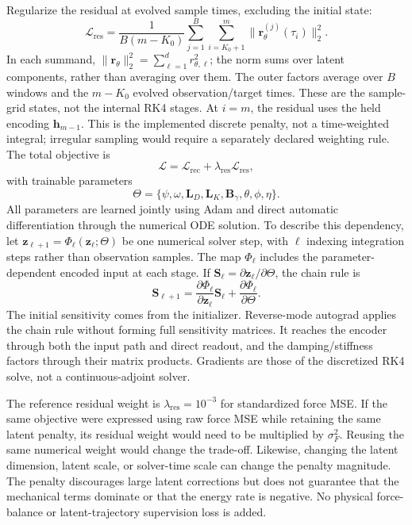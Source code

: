 \documentclass[journal,twoside]{IEEEtran}
\begin{document}
Regularize the residual at evolved sample times, excluding the initial state:
\begin{equation}
    \mathcal L_{\mathrm{res}}=
    \frac{1}{B(m-K_0)}\sum_{j=1}^{B}\sum_{i=K_0+1}^{m}
    \|\mathbf r^{(j)}_\theta(\tau_i)\|_2^2.
    \label{eq:residual_loss}
\end{equation}
In each summand,
$\|\mathbf r_\theta\|_2^2=\sum_{\ell=1}^d r_{\theta,\ell}^2$;
the norm sums over latent components, rather than averaging over them.
The outer factors average over $B$ windows and the $m-K_0$ evolved
observation/target times. These are the sample-grid states, not the
internal RK4 stages. At $i=m$, the residual uses the held encoding
$\mathbf h_{m-1}$. This is the implemented discrete penalty, not a
time-weighted integral; irregular sampling would require a separately
declared weighting rule. The total objective is
\begin{equation}
    \mathcal L=\mathcal L_{\mathrm{rec}}
    +\lambda_{\mathrm{res}}\mathcal L_{\mathrm{res}},
    \label{eq:total_loss}
\end{equation}
with trainable parameters
\begin{equation}
    \Theta=\{\psi,\omega,\mathbf L_D,\mathbf L_K,
    \mathbf B_\gamma,\theta,\phi,\eta\}.
    \label{eq:trainable_parameters}
\end{equation}
All parameters are learned jointly using Adam and direct automatic
differentiation through the numerical ODE solution. To describe this
dependency, let $\mathbf z_{\ell+1}=\Phi_\ell(\mathbf z_\ell;\Theta)$
be one numerical solver step, with $\ell$ indexing integration steps
rather than observation samples. The map $\Phi_\ell$ includes the
parameter-dependent encoded input at each stage. If
$\mathbf S_\ell=\partial\mathbf z_\ell/\partial\Theta$, the chain rule is
\begin{equation}
    \mathbf S_{\ell+1}=
    \frac{\partial\Phi_\ell}{\partial\mathbf z_\ell}\mathbf S_\ell
    +\frac{\partial\Phi_\ell}{\partial\Theta}.
    \label{eq:solver_gradient}
\end{equation}
The initial sensitivity comes from the initializer. Reverse-mode autograd
applies the chain rule without forming full sensitivity matrices. It
reaches the encoder through both the input path and direct readout, and
the damping/stiffness factors through their matrix products. Gradients
are those of the discretized RK4 solve, not a continuous-adjoint solver.

The reference residual weight is $\lambda_{\mathrm{res}}=10^{-3}$ for
standardized force MSE. If the same objective were expressed using raw
force MSE while retaining the same latent penalty, its residual weight
would need to be multiplied by $\sigma_F^2$. Reusing the same numerical
weight would change the trade-off. Likewise, changing the latent dimension,
latent scale, or solver-time scale can change the penalty magnitude.
The penalty discourages large latent corrections but does not guarantee
that the mechanical terms dominate or that the energy rate is negative.
No physical force-balance or latent-trajectory supervision loss is added.
\end{document}
